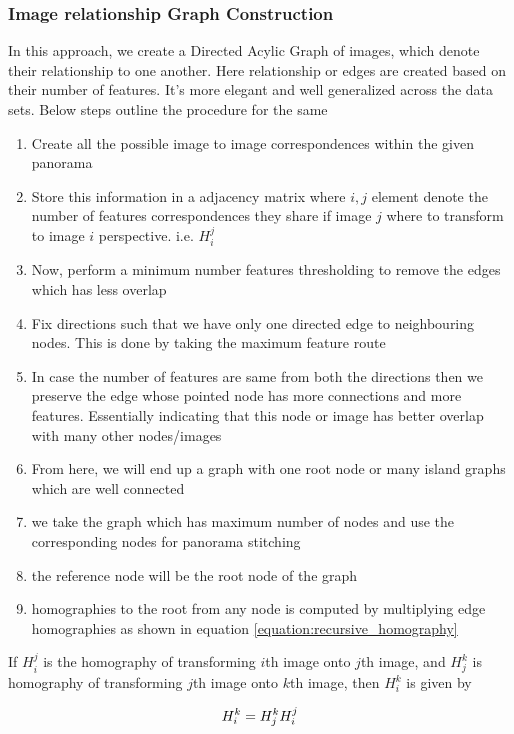 \documentclass[conference]{IEEEtran}
\begin{document}
\subsubsection{Image relationship Graph Construction}
In this approach, we create a Directed Acylic Graph of images, which denote their relationship to one another. Here relationship or edges are created based on their number of features. It's more elegant and well generalized across the data sets. Below steps outline the procedure for the same 
\begin{enumerate}
    \item Create all the possible image to image correspondences within the given panorama 
    \item Store this information in a adjacency matrix where $i,j$ element denote the number of features correspondences they share if image $j$ where to transform to image $i$ perspective. i.e. $H_{i}^{j}$
    \item Now, perform a minimum number features thresholding to remove the edges which has less overlap
    \item Fix directions such that we have only one directed edge to neighbouring nodes. This is done by taking the maximum feature route
    \item In case the number of features are same from both the directions then we preserve the edge whose pointed node has more connections and more features. Essentially indicating that this node or image has better overlap with many other nodes/images
    \item From here, we will end up a graph with one root node or many island graphs which are well connected
    \item we take the graph which has maximum number of nodes and use the corresponding nodes for panorama stitching
    \item the reference node will be the root node of the graph
    \item homographies to the root from any node is computed by multiplying edge homographies as shown in equation \ref{equation:recursive_homography} 
\end{enumerate}
If $H_{i}^{j}$ is the homography of transforming $i$th image onto $j$th image, and $H_{j}^{k}$ is homography of transforming $j$th image onto $k$th image, then $H_{i}^{k}$ is given by 

\begin{equation}
H_{i}^{k} \space = \space H_{j}^{k}H_{i}^{j}
\end{equation}
\end{document}

